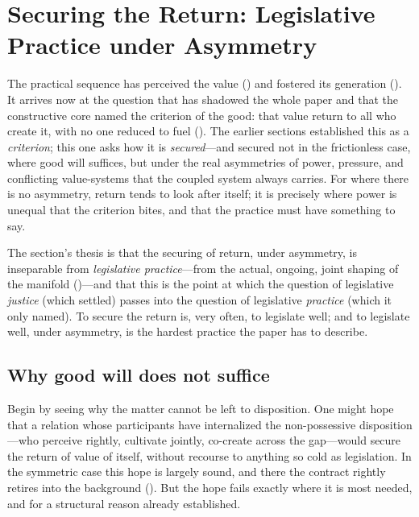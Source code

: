 \section{Securing the Return: Legislative Practice under Asymmetry}
\label{p09:sec:return}

\noindent
The practical sequence has perceived the value () and fostered its generation (). It arrives now at the question that has shadowed the whole paper and that the constructive core named the criterion of the good: that value return to all who create it, with no one reduced to fuel (). The earlier sections established this as a \emph{criterion}; this one asks how it is \emph{secured}---and secured not in the frictionless case, where good will suffices, but under the real asymmetries of power, pressure, and conflicting value-systems that the coupled system always carries. For where there is no asymmetry, return tends to look after itself; it is precisely where power is unequal that the criterion bites, and that the practice must have something to say.

The section's thesis is that the securing of return, under asymmetry, is inseparable from \emph{legislative practice}---from the actual, ongoing, joint shaping of the manifold ()---and that this is the point at which the question of legislative \emph{justice} (which  settled) passes into the question of legislative \emph{practice} (which it only named). To secure the return is, very often, to legislate well; and to legislate well, under asymmetry, is the hardest practice the paper has to describe.

\subsection{Why good will does not suffice}
\label{p09:sec:not-goodwill}

Begin by seeing why the matter cannot be left to disposition. One might hope that a relation whose participants have internalized the non-possessive disposition---who perceive rightly, cultivate jointly, co-create across the gap---would secure the return of value of itself, without recourse to anything so cold as legislation. In the symmetric case this hope is largely sound, and there the contract rightly retires into the background (). But the hope fails exactly where it is most needed, and for a structural reason already established.

